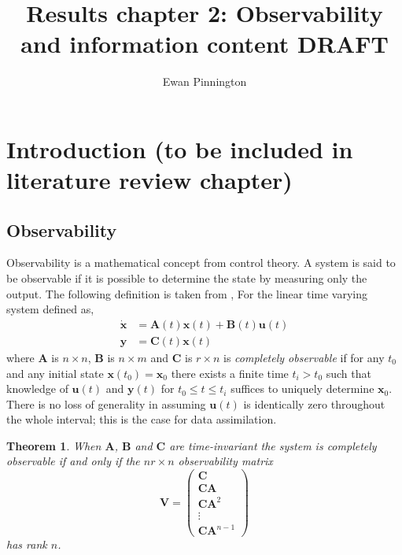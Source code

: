 \documentclass[11pt]{article}
\title{Results chapter 2: Observability and information content {\color{red}DRAFT}}
\author{Ewan Pinnington}
\newtheorem{theorem}{Theorem}[section]
\begin{document}
\maketitle

\section{Introduction (to be included in literature review chapter)}

\subsection{Observability}

Observability is a mathematical concept from control theory. A system is said to be observable if it is possible to determine the state by measuring only the output. The following definition is taken from \citet{barnett1985introduction}, For the linear time varying system defined as,
\begin{align}
\dot{\textbf{x}} &= \textbf{A}(t)\textbf{x}(t) +\textbf{B}(t)\textbf{u}(t) \\
\textbf{y} &= \textbf{C}(t)\textbf{x}(t)
\end{align}
where $\textbf{A}$ is $n \times n$, $\textbf{B}$ is $n \times m$ and $\textbf{C}$ is $r \times n$ is \textit{completely observable} if for any $t_0$ and any initial state $\textbf{x}(t_0) = \textbf{x}_0$ there exists a finite time $t_i > t_0$ such that knowledge of $\textbf{u}(t)$ and $\textbf{y}(t)$ for $t_0 \leq t \leq t_i$ suffices to uniquely determine $\textbf{x}_0$. There is no loss of generality in assuming $\textbf{u}(t)$ is identically zero throughout the whole interval; this is the case for data assimilation.

\begin{theorem} \label{thm:observable}
When $\textbf{A}$, $\textbf{B}$ and $\textbf{C}$ are time-invariant the system is completely observable if and only if the $nr \times n$ observability matrix
\begin{equation}
\mathbf{V}=
\begin{pmatrix}
\mathbf{C} \\
\mathbf{C}\mathbf{A}\\
\mathbf{C}\mathbf{A}^{2}\\
\vdots \\
\mathbf{C}\mathbf{A}^{n-1}
\end{pmatrix}
\end{equation}
has rank $n$.
\end{theorem}
\end{document}
